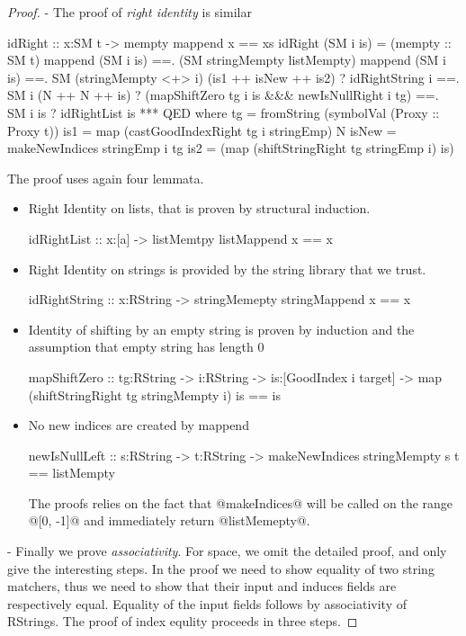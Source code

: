 \begin{proof}

- The proof of \textit{right identity} is similar
\begin{code}
idRight :: x:SM t -> {mempty mappend x == xs }
idRight (SM i is)
  =  (mempty :: SM t) mappend (SM i is)
  ==. (SM stringMempty listMempty) mappend (SM i is)
  ==. SM (stringMempty <+> i) (is1 ++ isNew ++ is2)
       ? idRightString i
  ==. SM i (N ++ N ++ is)
       ? (mapShiftZero tg i is &&& newIsNullRight i tg)
  ==. SM i is
       ? idRightList is
  *** QED
  where
    tg    = fromString (symbolVal (Proxy :: Proxy t))
    is1   = map (castGoodIndexRight tg i stringEmp) N
    isNew = makeNewIndices stringEmp i tg
    is2   = (map (shiftStringRight tg stringEmp i) is)
\end{code}
The proof uses again four lemmata.
\begin{itemize}
\item Right Identity on lists, that is proven by structural induction.
\begin{code}
idRightList :: x:[a] -> {listMemtpy listMappend x == x}
\end{code}
\item Right Identity on strings is provided by the string library that we trust.
\begin{code}
idRightString :: x:RString -> {stringMemepty stringMappend x == x}
\end{code}
\item Identity of shifting by an empty string is proven by induction and
the assumption that empty string has length 0
\begin{code}
mapShiftZero :: tg:RString -> i:RString -> is:[GoodIndex i target]
  -> {map (shiftStringRight tg stringMempty i) is == is }
\end{code}
\item No new indices are created by mappend
\begin{code}
newIsNullLeft :: s:RString -> t:RString
  -> {makeNewIndices stringMempty s t == listMempty }
\end{code}
The proofs relies on the fact that @makeIndices@
will be called on the range @[0, -1]@ and immediately return @listMemepty@.
\end{itemize}
- Finally we prove \textit{associativity}.
For space, we omit the detailed proof, and only give the interesting steps.
In the proof we need to show equality of two string matchers,
thus we need to show that their input and induces fields are respectively equal.
%
Equality of the input fields follows by associativity of RStrings.
%
The proof of index equlity proceeds in three steps.


\end{proof}
